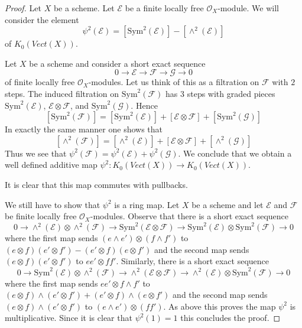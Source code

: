 \documentclass[10pt,a4paper]{amsart}
\theoremstyle{plain}
\theoremstyle{definition}
\theoremstyle{remark}
\numberwithin{equation}{subsection}
\begin{document}
\begin{proof}
Let $X$ be a scheme.
Let $\mathcal{E}$ be a finite locally free $\mathcal{O}_X$-module.
We will consider the element
$$
\psi^2(\mathcal{E}) = [\text{Sym}^2(\mathcal{E})] - [\wedge^2(\mathcal{E})]
$$
of $K_0(\textit{Vect}(X))$.

\medskip\noindent
Let $X$ be a scheme and consider a short exact sequence
$$
0 \to \mathcal{E} \to \mathcal{F} \to \mathcal{G} \to 0
$$
of finite locally free $\mathcal{O}_X$-modules. Let us think of
this as a filtration on $\mathcal{F}$ with $2$ steps. The induced
filtration on $\text{Sym}^2(\mathcal{F})$ has $3$ steps with
graded pieces $\text{Sym}^2(\mathcal{E})$, $\mathcal{E} \otimes \mathcal{F}$,
and $\text{Sym}^2(\mathcal{G})$. Hence
$$
[\text{Sym}^2(\mathcal{F})] =
[\text{Sym}^2(\mathcal{E})] +
[\mathcal{E} \otimes \mathcal{F}] +
[\text{Sym}^2(\mathcal{G})]
$$
In exactly the same manner one shows that
$$
[\wedge^2(\mathcal{F})] =
[\wedge^2(\mathcal{E})] +
[\mathcal{E} \otimes \mathcal{F}] +
[\wedge^2(\mathcal{G})]
$$
Thus we see that
$\psi^2(\mathcal{F}) = \psi^2(\mathcal{E}) + \psi^2(\mathcal{G})$.
We conclude that we obtain a well defined additive map
$\psi^2 : K_0(\textit{Vect}(X)) \to K_0(\textit{Vect}(X))$.

\medskip\noindent
It is clear that this map commutes with pullbacks.

\medskip\noindent
We still have to show that $\psi^2$ is a ring map.
Let $X$ be a scheme and let $\mathcal{E}$ and $\mathcal{F}$
be finite locally free $\mathcal{O}_X$-modules.
Observe that there is a short exact sequence
$$
0 \to \wedge^2(\mathcal{E}) \otimes \wedge^2(\mathcal{F}) \to
\text{Sym}^2(\mathcal{E} \otimes \mathcal{F}) \to
\text{Sym}^2(\mathcal{E}) \otimes \text{Sym}^2(\mathcal{F}) \to 0
$$
where the first map sends $(e \wedge e') \otimes (f \wedge f')$ to
$(e \otimes f)(e' \otimes f') - (e' \otimes f)(e \otimes f')$ and
the second map sends $(e \otimes f) (e' \otimes f')$ to $ee' \otimes ff'$.
Similarly, there is a short exact sequence
$$
0 \to \text{Sym}^2(\mathcal{E}) \otimes \wedge^2(\mathcal{F}) \to
\wedge^2(\mathcal{E} \otimes \mathcal{F}) \to
\wedge^2(\mathcal{E}) \otimes \text{Sym}^2(\mathcal{F}) \to 0
$$
where the first map sends $e e' \otimes f \wedge f'$ to
$(e \otimes f) \wedge (e' \otimes f') + (e' \otimes f) \wedge (e \otimes f')$
and the second map sends
$(e \otimes f) \wedge (e' \otimes f')$ to
$(e \wedge e') \otimes (f f')$.
As above this proves the map $\psi^2$ is multiplicative.
Since it is clear that $\psi^2(1) = 1$ this concludes the proof.
\end{proof}
\end{document}
